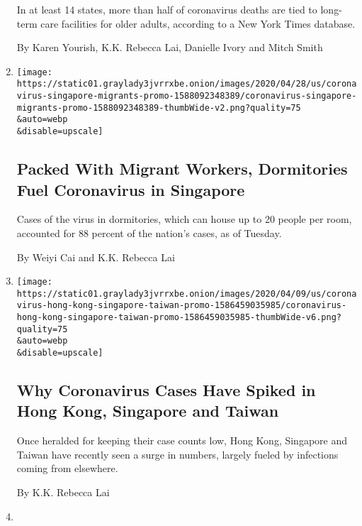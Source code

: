 \begin{enumerate}
  In at least 14 states, more than half of coronavirus deaths are tied
  to long-term care facilities for older adults, according to a New York
  Times database.

  By Karen Yourish, K.K. Rebecca Lai, Danielle Ivory and Mitch Smith
\item
  \href{/interactive/2020/04/28/world/asia/coronavirus-singapore-migrants.html}{}

  \texttt{[image: https://static01.graylady3jvrrxbe.onion/images/2020/04/28/us/coronavirus-singapore-migrants-promo-1588092348389/coronavirus-singapore-migrants-promo-1588092348389-thumbWide-v2.png?quality=75\\\&auto=webp\\\&disable=upscale]}

  \hypertarget{packed-with-migrant-workers-dormitories-fuel-coronavirus-in-singapore}{%
  \subsection{Packed With Migrant Workers, Dormitories Fuel Coronavirus
  in
  Singapore}\label{packed-with-migrant-workers-dormitories-fuel-coronavirus-in-singapore}}

  Cases of the virus in dormitories, which can house up to 20 people per
  room, accounted for 88 percent of the nation's cases, as of Tuesday.

  By Weiyi Cai and K.K. Rebecca Lai
\item
  \href{/interactive/2020/04/09/world/asia/coronavirus-hong-kong-singapore-taiwan.html}{}

  \texttt{[image: https://static01.graylady3jvrrxbe.onion/images/2020/04/09/us/coronavirus-hong-kong-singapore-taiwan-promo-1586459035985/coronavirus-hong-kong-singapore-taiwan-promo-1586459035985-thumbWide-v6.png?quality=75\\\&auto=webp\\\&disable=upscale]}

  \hypertarget{why-coronavirus-cases-have-spiked-in-hong-kong-singapore-and-taiwan}{%
  \subsection{Why Coronavirus Cases Have Spiked in Hong Kong, Singapore
  and
  Taiwan}\label{why-coronavirus-cases-have-spiked-in-hong-kong-singapore-and-taiwan}}

  Once heralded for keeping their case counts low, Hong Kong, Singapore
  and Taiwan have recently seen a surge in numbers, largely fueled by
  infections coming from elsewhere.

  By K.K. Rebecca Lai
\item
  \href{/interactive/2020/04/03/world/coronavirus-flatten-the-curve-countries.html}{}


\end{enumerate}

